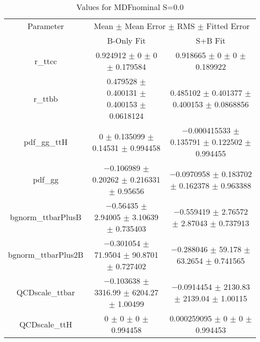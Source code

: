 \begin{table}
\centering
\caption{Values for MDFnominal S=0.0}
\begin{tabular}{ccc}
\toprule
Parameter & \multicolumn{2}{c}{Mean $\pm$ Mean Error $\pm$ RMS $\pm$ Fitted Error}\\
 & B-Only Fit & S+B Fit\\
\midrule
r\_ttcc & \num{0.924912} $\pm$ \num{0} $\pm$ \num{0} $\pm$ \num{0.179584} & \num{0.918665} $\pm$ \num{0} $\pm$ \num{0} $\pm$ \num{0.189922}\\
r\_ttbb & \num{0.479528} $\pm$ \num{0.400131} $\pm$ \num{0.400153} $\pm$ \num{0.0618124} & \num{0.485102} $\pm$ \num{0.401377} $\pm$ \num{0.400153} $\pm$ \num{0.0868856}\\
pdf\_gg\_ttH & \num{0} $\pm$ \num{0.135099} $\pm$ \num{0.14531} $\pm$ \num{0.994458} & \num{-0.000415533} $\pm$ \num{0.135791} $\pm$ \num{0.122502} $\pm$ \num{0.994455}\\
pdf\_gg & \num{-0.106989} $\pm$ \num{0.20262} $\pm$ \num{0.216331} $\pm$ \num{0.95656} & \num{-0.0970958} $\pm$ \num{0.183702} $\pm$ \num{0.162378} $\pm$ \num{0.963388}\\
bgnorm\_ttbarPlusB & \num{-0.56435} $\pm$ \num{2.94005} $\pm$ \num{3.10639} $\pm$ \num{0.735403} & \num{-0.559419} $\pm$ \num{2.76572} $\pm$ \num{2.87043} $\pm$ \num{0.737913}\\
bgnorm\_ttbarPlus2B & \num{-0.301054} $\pm$ \num{71.9504} $\pm$ \num{90.8701} $\pm$ \num{0.727402} & \num{-0.288046} $\pm$ \num{59.178} $\pm$ \num{63.2654} $\pm$ \num{0.741565}\\
QCDscale\_ttbar & \num{-0.103638} $\pm$ \num{3316.99} $\pm$ \num{6204.27} $\pm$ \num{1.00499} & \num{-0.0914454} $\pm$ \num{2130.83} $\pm$ \num{2139.04} $\pm$ \num{1.00115}\\
QCDscale\_ttH & \num{0} $\pm$ \num{0} $\pm$ \num{0} $\pm$ \num{0.994458} & \num{0.000259095} $\pm$ \num{0} $\pm$ \num{0} $\pm$ \num{0.994453}\\
\bottomrule
\end{tabular}
\end{table}